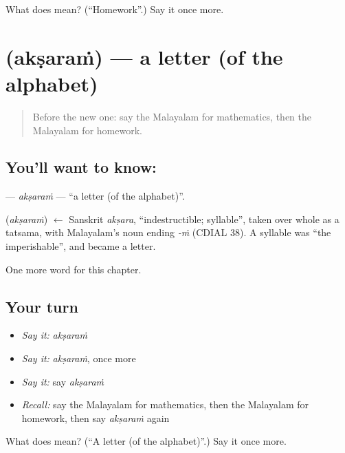 \begin{tcolorbox}[breakable,colback=teal!4,colframe=teal!35!black,title={Before you move on}]
What does  mean? (\textquotedblleft{}Homework\textquotedblright{}.) Say it once more.
\end{tcolorbox}
\section[\texorpdfstring{\ml{അക്ഷരം} (akṣaraṁ)}{അക്ഷരം (akṣaraṁ)}]{ (akṣaraṁ) — a letter (of the alphabet)}

\label{lesson:ML-C335-aksaram}



\begin{quote}
Before the new one: say the Malayalam for mathematics, then the Malayalam for homework.
\end{quote}

\subsection*{You'll want to know: }
\textbf{} — \emph{akṣaraṁ} — \textquotedblleft{}a letter (of the alphabet)\textquotedblright{}.

\begin{cousinweb}
\textbf{} (\emph{akṣaraṁ}) $\leftarrow$ Sanskrit \emph{akṣara}, \textquotedblleft{}indestructible; syllable\textquotedblright{}, taken over whole as a tatsama, with Malayalam's noun ending \emph{-ṁ} (CDIAL 38). A syllable was \textquotedblleft{}the imperishable\textquotedblright{}, and became a letter.
\end{cousinweb}

\begin{grammarlens}[title={What you've built}]
One more word for this chapter.
\end{grammarlens}

\subsection*{Your turn}
\begin{itemize}
\raggedright
  \item \emph{Say it:} \emph{akṣaraṁ}
  \item \emph{Say it:} \emph{akṣaraṁ}, once more
  \item \emph{Say it:} say \emph{akṣaraṁ}
  \item \emph{Recall:} say the Malayalam for mathematics, then the Malayalam for homework, then say \emph{akṣaraṁ} again
\end{itemize}

\begin{tcolorbox}[breakable,colback=teal!4,colframe=teal!35!black,title={Before you move on}]
What does  mean? (\textquotedblleft{}A letter (of the alphabet)\textquotedblright{}.) Say it once more.
\end{tcolorbox}

